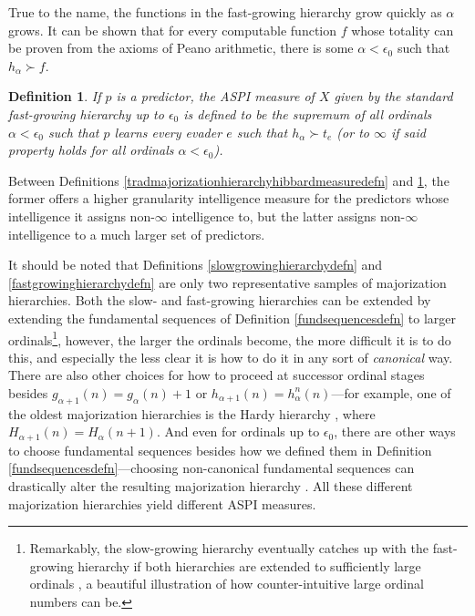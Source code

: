 \documentclass{article}
\newtheorem{definition}[theorem]{Definition}
\begin{document}
True to the name, the functions in the fast-growing hierarchy grow quickly
as $\alpha$ grows. It can be shown \cite{wainer1987provably} that
for every computable function $f$ whose totality can be proven from the axioms of
Peano arithmetic, there is some $\alpha<\epsilon_0$ such that $h_\alpha\succ f$.

\begin{definition}
\label{fastmajorizationhierarchyhibbardmeasuredefn}
    If $p$ is a predictor, the \emph{ASPI measure of $X$ given by the
    standard fast-growing hierarchy up to $\epsilon_0$} is defined to be the
    supremum of all ordinals $\alpha<\epsilon_0$ such that
    $p$ learns every evader $e$ such that $h_\alpha\succ t_e$ (or to
    $\infty$ if said property holds for all ordinals $\alpha<\epsilon_0$).
\end{definition}

Between Definitions \ref{tradmajorizationhierarchyhibbardmeasuredefn} and
\ref{fastmajorizationhierarchyhibbardmeasuredefn}, the former offers a higher
granularity
intelligence measure for the predictors whose intelligence it assigns non-$\infty$
intelligence to, but the latter assigns non-$\infty$ intelligence to a much larger
set of predictors.

It should be noted that Definitions \ref{slowgrowinghierarchydefn}
and \ref{fastgrowinghierarchydefn} are only two
representative samples of
majorization hierarchies. Both the slow- and fast-growing hierarchies can be
extended by extending the fundamental sequences of Definition
\ref{fundsequencesdefn} to larger ordinals\footnote{Remarkably,
the slow-growing hierarchy eventually catches up with the fast-growing hierarchy
if both hierarchies are extended to sufficiently large ordinals
\cite{wainer1989slow} \cite{girard1981pi12}, a beautiful illustration of
how counter-intuitive
large ordinal numbers can be.}, however, the larger
the ordinals become, the more difficult it is to do this, and especially the less
clear it is how to do it in any sort of \emph{canonical} way.
There are also other choices for how to proceed at successor ordinal stages besides
$g_{\alpha+1}(n)=g_\alpha(n)+1$ or $h_{\alpha+1}(n)=h^n_\alpha(n)$---for example,
one of the oldest majorization hierarchies is the Hardy hierarchy
\cite{hardy1904theorem}, where $H_{\alpha+1}(n)=H_\alpha(n+1)$.
And even for ordinals up to $\epsilon_0$,
there are other ways to choose fundamental sequences besides how we defined them in
Definition \ref{fundsequencesdefn}---choosing non-canonical fundamental sequences can
drastically alter the resulting majorization hierarchy \cite{weiermann1997sometimes}.
All these different majorization hierarchies yield different ASPI measures.
\end{document}
